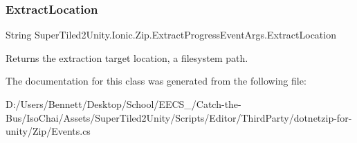 \subsubsection{\texorpdfstring{Extract\+Location}{ExtractLocation}}
{\footnotesize\ttfamily String Super\+Tiled2\+Unity.\+Ionic.\+Zip.\+Extract\+Progress\+Event\+Args.\+Extract\+Location\hspace{0.3cm}{\ttfamily [get]}}



Returns the extraction target location, a filesystem path. 



The documentation for this class was generated from the following file\+:\begin{DoxyCompactItemize}
\item 
D\+:/\+Users/\+Bennett/\+Desktop/\+School/\+E\+E\+C\+S\+\_/\+Catch-\/the-\/\+Bus/\+Iso\+Chai/\+Assets/\+Super\+Tiled2\+Unity/\+Scripts/\+Editor/\+Third\+Party/dotnetzip-\/for-\/unity/\+Zip/Events.\+cs\end{DoxyCompactItemize}
